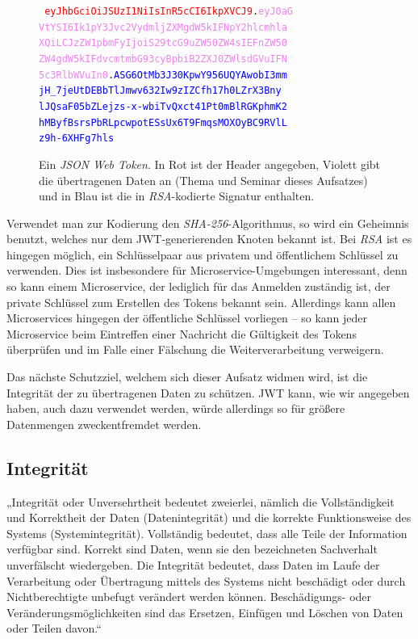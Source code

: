 \begin{figure}[b]
	\centering
	{\tt \textcolor{red}{
			eyJhbGciOiJSUzI1NiIsInR5cCI6IkpXVCJ9}.\textcolor{violet}{eyJ0aG\\
			VtYSI6Ik1pY3Jvc2VydmljZXMgdW5kIFNpY2hlcmhla\\
			XQiLCJzZW1pbmFyIjoiS29tcG9uZW50ZW4sIEFnZW50\\
			ZW4gdW5kIFdvcmtmbG93cyBpbiB2ZXJ0ZWlsdGVuIFN\\
			5c3RlbWVuIn0}.\textcolor{blue}{ASG6OtMb3J30KpwY956UQYAwobI3mm\\
			jH\_7jeUtDEBbTlJmwv632Iw9zIZCfh17h0LZrX3Bny\\
			lJQsaF05bZLejzs-x-wbiTvQxct41Pt0mBlRGKphmK2\\
			hMByfBsrsPbRLpcwpotESsUx6T9FmqsMOXOyBC9RVlL\\
			z9h-6XHFg7hls}}
	\caption{Ein \textit{JSON Web Token}. In Rot ist der Header angegeben, Violett gibt die übertragenen Daten an (Thema und Seminar dieses Aufsatzes) und in Blau ist die in \textit{RSA}-kodierte Signatur enthalten.}
	\label{fig:jwt}
\end{figure}

Verwendet man zur Kodierung den \textit{SHA-256}-Algorithmus, so wird ein Geheimnis benutzt, welches nur dem JWT-generierenden Knoten bekannt ist. Bei \textit{RSA} ist es hingegen möglich, ein Schlüsselpaar aus privatem und öffentlichem Schlüssel zu verwenden. Dies ist insbesondere für Microservice-Umgebungen interessant, denn so kann einem Microservice, der lediglich für das Anmelden zuständig ist, der private Schlüssel zum Erstellen des Tokens bekannt sein. Allerdings kann allen Microservices hingegen der öffentliche Schlüssel vorliegen – so kann jeder Microservice beim Eintreffen einer Nachricht die Gültigkeit des Tokens überprüfen und im Falle einer Fälschung die Weiterverarbeitung verweigern.

Das nächste Schutzziel, welchem sich dieser Aufsatz widmen wird, ist die Integrität der zu übertragenen Daten zu schützen. JWT kann, wie wir angegeben haben, auch dazu verwendet werden, würde allerdings so für größere Datenmengen zweckentfremdet werden.


\subsection{Integrität}
\label{subsec:integrität}
„Integrität oder Unversehrtheit bedeutet zweierlei, nämlich die Vollständigkeit und Korrektheit der Daten (Datenintegrität) und die korrekte Funktionsweise des Systems (Systemintegrität). Vollständig bedeutet, dass alle Teile der Information verfügbar sind. Korrekt sind Daten, wenn sie den bezeichneten Sachverhalt unverfälscht wiedergeben. Die Integrität bedeutet, dass Daten im Laufe der Verarbeitung oder Übertragung mittels des Systems nicht beschädigt oder durch Nichtberechtigte unbefugt verändert werden können. Beschädigungs- oder Veränderungsmöglichkeiten sind das Ersetzen, Einfügen und Löschen von Daten oder Teilen davon.“ \cite{Bedner+10}

